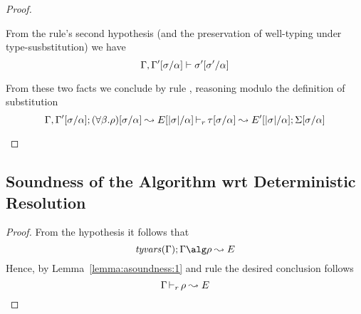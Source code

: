\begin{proof}
\begin{description}
  From the rule's second hypothesis (and the preservation of well-typing under type-susbstitution) we have
\begin{equation*}
  \Gamma,\Gamma'[\sigma/\alpha] \vdash \sigma'[\sigma'/\alpha]
\end{equation*}

  From these two facts we conclude by rule , reasoning modulo
  the definition of substitution
\begin{equation*}
  \Gamma,\Gamma'[\sigma/\alpha]; (\forall\beta.\rho)[\sigma/\alpha] \leadsto E[|\sigma|/\alpha] \mathop{\vdash_{r}} \tau[\sigma/\alpha] \leadsto E'[|\sigma|/\alpha]; \Sigma[\sigma/\alpha]
\end{equation*}

\end{description}
\end{proof}

\subsection{Soundness of the Algorithm wrt Deterministic Resolution}

{\centering
{}}

\begin{proof}
  From the hypothesis it follows that 
\begin{equation*}
  \mathit{tyvars}(\tenv);\tenv \alg \rulet \leadsto E
\end{equation*}
  Hence, by Lemma~\ref{lemma:asoundness:1} and rule  the desired conclusion follows
\begin{equation*}
  \Gamma \mathop{\vdash_{r}} \rho \leadsto E
\end{equation*}
\end{proof}

{\centering
{}}

